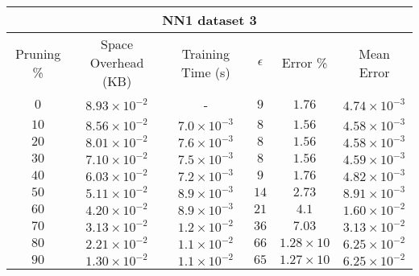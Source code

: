 \begin{adjustwidth}{0cm}{}
\begin{tabular}{cccccc}
\hline
\multicolumn{6}{c}{NN1 dataset 3} \\
\toprule
Pruning \% & Space Overhead (KB) & Training Time (s) & $\epsilon$ & Error \% & Mean Error\\
\midrule
$0$ & $8.93 \times 10^{-2}$ & - & $9$ & $1.76$ & $4.74 \times 10^{-3}$\\
$10$ & $8.56 \times 10^{-2}$ & $7.0 \times 10^{-3}$ & $8$ & $1.56$ & $4.58 \times 10^{-3}$\\
$20$ & $8.01 \times 10^{-2}$ & $7.6 \times 10^{-3}$ & $8$ & $1.56$ & $4.58 \times 10^{-3}$\\
$30$ & $7.10 \times 10^{-2}$ & $7.5 \times 10^{-3}$ & $8$ & $1.56$ & $4.59 \times 10^{-3}$\\
$40$ & $6.03 \times 10^{-2}$ & $7.2 \times 10^{-3}$ & $9$ & $1.76$ & $4.82 \times 10^{-3}$\\
$50$ & $5.11 \times 10^{-2}$ & $8.9 \times 10^{-3}$ & $14$ & $2.73$ & $8.91 \times 10^{-3}$\\
$60$ & $4.20 \times 10^{-2}$ & $8.9 \times 10^{-3}$ & $21$ & $4.1$ & $1.60 \times 10^{-2}$\\
$70$ & $3.13 \times 10^{-2}$ & $1.2 \times 10^{-2}$ & $36$ & $7.03$ & $3.13 \times 10^{-2}$\\
$80$ & $2.21 \times 10^{-2}$ & $1.1 \times 10^{-2}$ & $66$ & $1.28 \times 10$ & $6.25 \times 10^{-2}$\\
$90$ & $1.30 \times 10^{-2}$ & $1.1 \times 10^{-2}$ & $65$ & $1.27 \times 10$ & $6.25 \times 10^{-2}$\\
\bottomrule
\end{tabular}
\end{adjustwidth}

\par\null\par
\par\null\par

